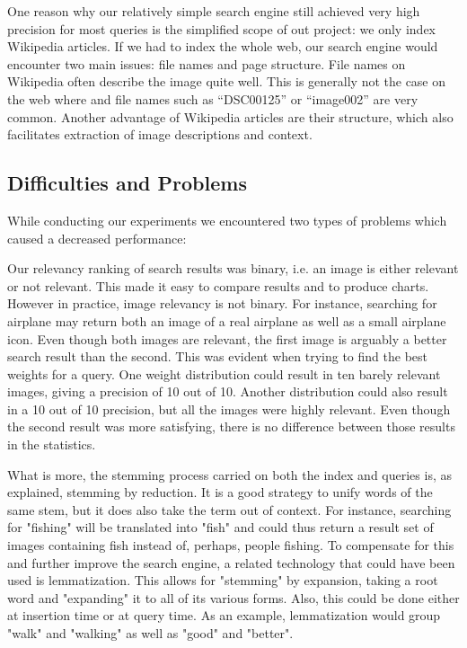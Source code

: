 \documentclass[a4paper]{article}
\begin{document}
One reason why our relatively simple search engine still achieved very high precision for most queries is the simplified scope of out project: we only index Wikipedia articles. If we had to index the whole web, our search engine would encounter two main issues: file names and page structure. File names on Wikipedia often describe the image quite well. This is generally not the case on the web where and file names such as “DSC00125” or “image002” are very common. Another advantage of Wikipedia articles are their structure, which also facilitates extraction of image descriptions and context.

\subsection{Difficulties and Problems}	
While conducting our experiments we encountered two types of problems which caused a decreased performance:

Our relevancy ranking of search results was binary, i.e. an image is either relevant or not relevant. This made it easy to compare results and to produce charts. However in practice, image relevancy is not binary. For instance, searching for airplane may return both an image of a real airplane as well as a small airplane icon. Even though both images are relevant, the first image is arguably a better search result than the second. This was evident when trying to find the best weights for a query. One weight distribution could result in ten barely relevant images, giving a precision of 10 out of 10. Another distribution could also result in a 10 out of 10 precision, but all the images were highly relevant. Even though the second result was more satisfying, there is no difference between those results in the statistics.

What is more, the stemming process carried on both the index and queries is, as explained, stemming by reduction. It is a good strategy to unify words of the same stem, but it does also take the term out of context. For instance, searching for "fishing" will be translated into "fish" and could thus return a result set of images containing fish instead of, perhaps, people fishing. To compensate for this and further improve the search engine, a related technology that could have been used is lemmatization. This allows for "stemming" by expansion, taking a root word and "expanding" it to all of its various forms. Also, this could be done either at insertion time or at query time. As an example, lemmatization would group "walk" and "walking" as well as "good" and "better". 
\end{document}
